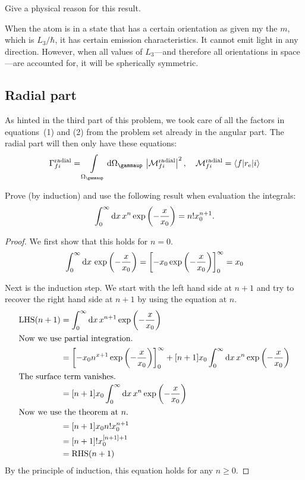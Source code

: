 \documentclass[11pt, english, fleqn, DIV=15, headinclude, BCOR=1.5cm]{scrartcl}
\newcommand\ra{^\text{radial}}
\begin{document}
\begin{problem}
    Give a physical reason for this result.
\end{problem}

When the atom is in a state that has a certain orientation as given my the $m$,
which is $L_3 / \hbar$, it has certain emission characteristics. It cannot
emit light in any direction. However, when all values of $L_3$---and therefore
all orientations in space---are accounted for, it will be spherically
symmetric.

\subsection{Radial part}

As hinted in the third part of this problem, we took care of all the factors in
equations~(1) and (2) from the problem set already in the angular part. The
radial part will then only have these equations:
\[
    \Gamma_{fi}\ra = \intop_{\Omega_\gammaup} \dif \Omega_\gammaup \,
    \abs{\mathcal M_{fi}\ra}^2
    \eqnsep
    \mathcal M_{fi}\ra = \braket{f|r_\text e|i}
\]

\begin{problem}
    Prove (by induction) and use the following result when evaluation the
    integrals:
    \[
        \int_0^\infty \mathop{}\!\mathrm d x \, x^n \exp\left( - \frac{x}{x_0} \right) = n! x_0^{n+1}.
    \]
\end{problem}

\begin{proof}
    We first show that this holds for $n = 0$.
    \[
        \int_0^\infty \mathop{}\!\mathrm d x \, \exp\left( - \frac{x}{x_0} \right)
        = \left[ -x_0 \exp\left( - \frac{x}{x_0} \right) \right]_0^\infty
        = x_0
    \]

    Next is the induction step. We start with the left hand side at $n + 1$ and
    try to recover the right hand side at $n+1$ by using the equation at $n$.
    \begin{align*}
        \operatorname{LHS}(n+1)
        &= \int_0^\infty \dif x \, x^{n+1} \exp\del{- \frac{x}{x_0}} \\
        \intertext{%
            Now we use partial integration.
        }
        &= \sbr{- x_0 n^{x+1} \exp\del{- \frac{x}{x_0}}}_0^\infty + [n+1] x_0
        \int_0^\infty \dif x \, x^{n} \exp\del{- \frac{x}{x_0}} \\
        \intertext{%
            The surface term vanishes.
        }
        &= [n+1] x_0 \int_0^\infty \dif x \, x^{n} \exp\del{- \frac{x}{x_0}} \\
        \intertext{%
            Now we use the theorem at $n$.
        }
        &= [n+1] x_0 n! x_0^{n+1} \\
        &= [n+1]! x_0^{[n+1]+1} \\
        &= \operatorname{RHS}(n+1)
    \end{align*}
    By the principle of induction, this equation holds for any $n \geq 0$.
\end{proof}
\end{document}
